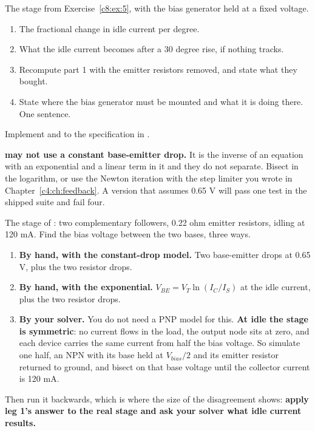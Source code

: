\label{c8:ex:6}
The stage from Exercise~\ref{c8:ex:5}, with the bias generator held at a fixed voltage.

\begin{enumerate}
  \item The fractional change in idle current per degree.
  \item What the idle current becomes after a 30 degree rise, if nothing tracks.
  \item Recompute part 1 with the emitter resistors removed, and state what they bought.
  \item State where the bias generator must be mounted and what it is doing there. One sentence.
\end{enumerate}

\label{c8:ex:7}
Implement  and  to the specification in .

\textbf{ may not use a constant base-emitter drop.} It is the inverse of an equation with an exponential and a linear term in it and they do not separate. Bisect in the logarithm, or use the Newton iteration with the step limiter you wrote in Chapter~\ref{c4:ch:feedback}. A version that assumes 0.65 V will pass one test in the shipped suite and fail four.

\label{c8:ex:8}
The stage of : two complementary followers, 0.22 ohm emitter resistors, idling at 120 mA. Find the bias voltage between the two bases, three ways.

\begin{enumerate}
  \item \textbf{By hand, with the constant-drop model.} Two base-emitter drops at 0.65 V, plus the two resistor drops.
  \item \textbf{By hand, with the exponential.} $V_{BE} = V_T \ln(I_C/I_S)$ at the idle current, plus the two resistor drops.
  \item \textbf{By your solver.} You do not need a PNP model for this. \textbf{At idle the stage is symmetric}: no current flows in the load, the output node sits at zero, and each device carries the same current from half the bias voltage. So simulate one half, an NPN with its base held at $V_{bias}/2$ and its emitter resistor returned to ground, and bisect on that base voltage until the collector current is 120 mA.
\end{enumerate}
Then run it backwards, which is where the size of the disagreement shows: \textbf{apply leg 1's answer to the real stage and ask your solver what idle current results.}

